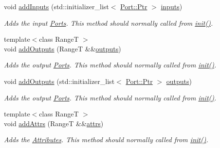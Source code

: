 \begin{DoxyCompactItemize}
void \hyperlink{classdg_1_1deepcore_1_1_node_a7450705ca067788cf0d77d2af7074b0b}{add\+Inputs} (std\+::initializer\+\_\+list$<$ \hyperlink{classdg_1_1deepcore_1_1_object_a4565c5c2ba828aaaa4354befbac8b2f9}{Port\+::\+Ptr} $>$ \hyperlink{classdg_1_1deepcore_1_1_node_a1e89da6fe3941b07685f0f57e6d2a4c6}{inputs})
\begin{DoxyCompactList}\small\item\em Adds the input \hyperlink{classdg_1_1deepcore_1_1_port}{Ports}. This method should normally called from \hyperlink{classdg_1_1deepcore_1_1_object_a0982aef61087daaf910acfe8b6dcac99}{init()}. \end{DoxyCompactList}\item 
{\footnotesize template$<$class RangeT $>$ }\\void \hyperlink{classdg_1_1deepcore_1_1_node_adb6cef5818fb0e04f1ded65b79b624c3}{add\+Outputs} (RangeT \&\&\hyperlink{classdg_1_1deepcore_1_1_node_a81cc04114467cd4724c05dfa3d1e975c}{outputs})
\begin{DoxyCompactList}\small\item\em Adds the output \hyperlink{classdg_1_1deepcore_1_1_port}{Ports}. This method should normally called from \hyperlink{classdg_1_1deepcore_1_1_object_a0982aef61087daaf910acfe8b6dcac99}{init()}. \end{DoxyCompactList}\item 
void \hyperlink{classdg_1_1deepcore_1_1_node_a8b8b97bd4e0359f9a022dcc29dcbe4ae}{add\+Outputs} (std\+::initializer\+\_\+list$<$ \hyperlink{classdg_1_1deepcore_1_1_object_a4565c5c2ba828aaaa4354befbac8b2f9}{Port\+::\+Ptr} $>$ \hyperlink{classdg_1_1deepcore_1_1_node_a81cc04114467cd4724c05dfa3d1e975c}{outputs})
\begin{DoxyCompactList}\small\item\em Adds the output \hyperlink{classdg_1_1deepcore_1_1_port}{Ports}. This method should normally called from \hyperlink{classdg_1_1deepcore_1_1_object_a0982aef61087daaf910acfe8b6dcac99}{init()}. \end{DoxyCompactList}\item 
{\footnotesize template$<$class RangeT $>$ }\\void \hyperlink{classdg_1_1deepcore_1_1_node_af3e02addf850ed8e5a5c79b2127f5e31}{add\+Attrs} (RangeT \&\&\hyperlink{classdg_1_1deepcore_1_1_node_acbf1083b3a00898cbd5170ac730e5777}{attrs})
\begin{DoxyCompactList}\small\item\em Adds the \hyperlink{classdg_1_1deepcore_1_1_attribute}{Attributes}. This method should normally called from \hyperlink{classdg_1_1deepcore_1_1_object_a0982aef61087daaf910acfe8b6dcac99}{init()}. \end{DoxyCompactList}\item 

\end{DoxyCompactItemize}

